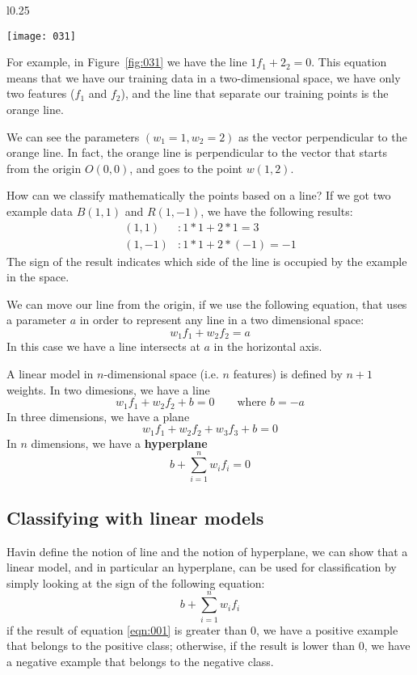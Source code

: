 \begin{example}
\begin{wrapfigure}{l}{0.25\textwidth}
\begin{center}
    \texttt{[image: 031]}
    \label{fig:031}
\end{center}
\caption{}
\end{wrapfigure}
For example, in Figure~\ref{fig:031} we have the line \(1f_1+2_2 = 0\). This equation means that we have our training data in a two-dimensional space, we have only two features (\(f_1\) and \(f_2\)), and the line that separate our training points is the orange line.

We can see the parameters \((w_1=1,w_2=2)\) as the vector perpendicular to the orange line. In fact, the orange line is perpendicular to the vector that starts from the origin \(O(0,0)\), and goes to the point \(w(1,2)\).

How can we classify mathematically the points based on a line? If we got two example data \(B(1,1)\) and \(R(1,-1)\), we have the following results:
\begin{align*}
(1,1) &: 1*1+2*1=3\\
(1,-1) &: 1*1+2*(-1)=-1
\end{align*}
The sign of the result indicates which side of the line is occupied by the example in the space.

\end{example}

We can move our line from the origin, if we use the following equation, that uses a parameter \(a\) in order to represent any line in a two dimensional space:
\[w_1f_1+w_2f_2=a\]
In this case we have a line intersects at \(a\) in the horizontal axis.

A linear model in \(n\)-dimensional space (i.e. \(n\) features) is defined by \(n+1\) weights. In two dimesions, we have a line 
\begin{equation}
    w_1f_1+w_2f_2+b=0 \qquad \text{where } b=-a
\end{equation}
In three dimensions, we have a plane
\[w_1f_1+w_2f_2+w_3f_3+b=0\]
In \(n\) dimensions, we have a \textbf{hyperplane}
\begin{equation}
    b+\sum_{i=1}^nw_if_i=0
\end{equation}

\subsection{Classifying with linear models}
Havin define the notion of line and the notion of hyperplane, we can show that a linear model, and in particular an hyperplane, can be used for classification by simply looking at the sign of the following equation:
\begin{equation}
\label{eqn:001}
b+\sum_{i=1}^nw_if_i
\end{equation}
if the result of equation \ref{eqn:001} is greater than \(0\), we have a positive example that belongs to the positive class; otherwise, if the result is lower than \(0\), we have a negative example that belongs to the negative class.

